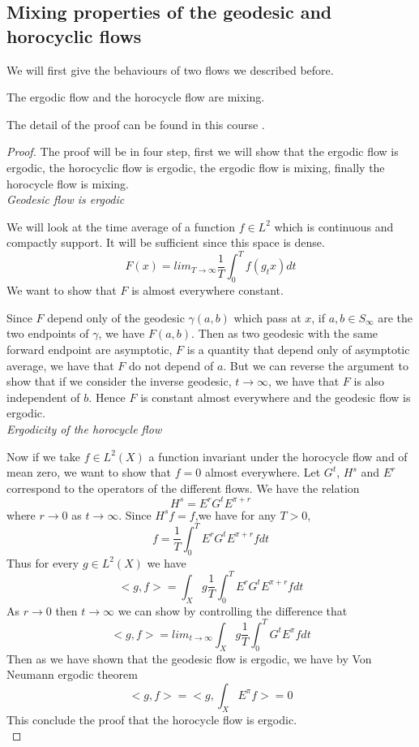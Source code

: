 \subsection{Mixing properties of the geodesic and horocyclic flows}

We will first give the behaviours of two flows we described before.

\begin{thm}
The ergodic flow and the horocycle flow are mixing.
\end{thm}
The detail of the proof can be found in this course \cite{Mcmullen1998HyperbolicM}.

\begin{proof}
The proof will be in four step, first we will show that the ergodic flow is ergodic, the horocyclic flow is ergodic, the ergodic flow is mixing, finally the horocycle flow is mixing.\\


\emph{Geodesic flow is ergodic}

We will look at the time average of a function $f \in L^2$ which is continuous and compactly support. It will be sufficient since this space is dense. \[
F(x) = lim_{T \to \infty} \frac{1}{T} \int_0^T f(g_t x)dt
\]
We want to show that $F$ is almost everywhere constant.

Since $F$ depend only of the geodesic $\gamma(a,b)$ which pass at $x$, if $a,b \in S_\infty$ are the two endpoints of $\gamma$, we have $F(a,b)$.
Then as two geodesic with the same forward endpoint are asymptotic, $F$ is a quantity that depend only of asymptotic average, we have that $F$ do not depend of $a$.
But we can reverse the argument to show that if we consider the inverse geodesic, $t \to \infty$, we have that $F$ is also independent of $b$. Hence $F$ is constant almost everywhere and the geodesic flow is ergodic.\\


\emph{Ergodicity of the horocycle flow}

Now if we take $f \in L^2(X)$ a function invariant under the horocycle flow and of mean zero, we want to show that $f=0$ almost everywhere.
Let $G^t$, $H^s$ and $E^r$ correspond to the operators of the different flows. We have the relation \[
H^s=E^r G^t E^{\pi+r}
\]
where $r \to 0$ as $t \to \infty$. Since $H^s f=f$,we have for any $T>0$,\[
f=\frac{1}{T} \int_0^T E^r G^t E^{\pi+r} f dt
\]
Thus for every $g \in L^2(X)$ we have \[
<g,f> = \int_X g \frac{1}{T} \int_0^T E^r G^t E^{\pi+r} f dt
\]
As $r \to 0$ then $t \to \infty$ we can show by controlling the difference that \[
<g,f> = lim_{t \to \infty} \int_X g \frac{1}{T} \int_0^T G^t E^{\pi} f dt
\]
Then as we have shown that the geodesic flow is ergodic, we have by Von Neumann ergodic theorem\[
<g,f> = <g,\int_X E^{\pi} f> =0
\]
This conclude the proof that the horocycle flow is ergodic.\\



\end{proof}
